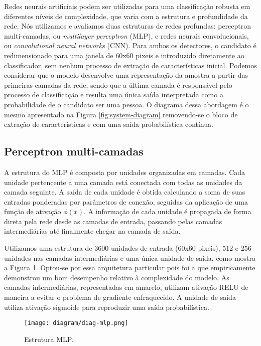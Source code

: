     Redes neurais artificiais podem ser utilizadas para uma classificação robusta em diferentes níveis de complexidade, que varia com a estrutura e profundidade da rede. Nós utilizamos e avaliamos duas estruturas de redes profundas: perceptron multi-camadas, ou \textit{multilayer perceptron} (MLP), e redes neurais convolucionais, ou \textit{convolutional neural networks} (CNN). Para ambos os detectores, o candidato é redimensionado para uma janela de 60x60 pixeis e introduzido diretamente ao classificador, sem nenhum processo de extração de características inicial. Podemos considerar que o modelo desenvolve uma representação da amostra a partir das primeiras camadas da rede, sendo que a última camada é responsável pelo processo de classificação e resulta uma única saída interpretada como a probabilidade de o candidato ser uma pessoa. O diagrama dessa abordagem é o mesmo apresentado na Figura \ref{fig:system-diagram} removendo-se o bloco de extração de características e com uma saída probabilística contínua.

    \subsection{Perceptron multi-camadas}
        A estrutura do MLP é composta por unidades organizadas em camadas. Cada unidade pertencente a uma camada está conectada com todas as unidades da camada seguinte. A saída de cada unidade é obtida calculando a soma de suas entradas ponderadas por parâmetros de conexão, seguidas da aplicação de uma função de ativação $\phi(x)$. A informação de cada unidade é propagada de forma direta pela rede desde as camadas de entrada, passando pelas camadas intermediárias até finalmente chegar na camada de saída.

        Utilizamos uma estrutura de 3600 unidades de entrada (60x60 pixeis), 512 e 256 unidades nas camadas intermediárias e uma única unidade de saída, como mostra a Figura \ref{fig:diag-mlp}. Optou-se por essa arquitetura particular pois foi a que empiricamente demonstrou um bom desempenho relativo à complexidade do modelo. As camadas intermediárias, representadas em amarelo, utilizam ativação RELU \cite{nair2010relu} de maneira a evitar o problema de gradiente enfraquecido. A unidade de saída utiliza ativação sigmoide para reproduzir uma saída probabilística.

        \begin{figure}
        \centering
        \texttt{[image: diagram/diag-mlp.png]}
        \caption{Estrutura MLP.}
        \label{fig:diag-mlp}
        \end{figure}


